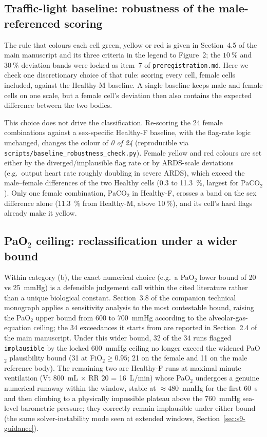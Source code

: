 \documentclass[pdflatex,sn-nature]{sn-jnl}%
\newcommand{\mainref}[2]{#2}
\begin{document}
\subsection{Traffic-light baseline: robustness of the male-referenced scoring}\label{sec:s3-traffic}

The rule that colours each cell green, yellow or red is given in Section~\mainref{sec:methods-traffic}{4.5} of the main manuscript and its three criteria in the legend to Figure~2; the $10~\%$ and $30~\%$ deviation bands were locked as item~7 of \texttt{preregistration.md}. Here we check one discretionary choice of that rule: scoring every cell, female cells included, against the Healthy-M baseline. A single baseline keeps male and female cells on one scale, but a female cell's deviation then also contains the expected difference between the two bodies.

This choice does not drive the classification. Re-scoring the 24 female combinations against a sex-specific Healthy-F baseline, with the flag-rate logic unchanged, changes the colour of \emph{0 of 24} (reproducible via \texttt{scripts/baseline\_robustness\_check.py}). Female yellow and red colours are set either by the diverged/implausible flag rate or by ARDS-scale deviations (e.g.\ output heart rate roughly doubling in severe ARDS), which exceed the male--female differences of the two Healthy cells (0.3 to 11.3~\%, largest for PaCO$_2$). Only one female combination, PaCO$_2$ in Healthy-F, crosses a band on the sex difference alone (11.3~\% from Healthy-M, above $10~\%$), and its cell's hard flags already make it yellow.

\subsection{PaO$_2$ ceiling: reclassification under a wider bound}\label{sec:s3-pao2-sensitivity}

Within category (b), the exact numerical choice (e.g.\ a PaO$_2$ lower bound of 20 vs 25~mmHg) is a defensible judgement call within the cited literature rather than a unique biological constant. Section~3.8 of the companion technical monograph applies a sensitivity analysis to the most contestable bound, raising the PaO$_2$ upper bound from 600 to 700~mmHg according to the alveolar-gas-equation ceiling; the 34 exceedances it starts from are reported in Section~\mainref{sec:results-hyperoxia}{2.4} of the main manuscript. Under this wider bound, 32 of the 34 runs flagged \texttt{implausible} by the locked 600~mmHg ceiling no longer exceed the widened PaO$_2$ plausibility bound (31 at FiO$_2 \geq 0.95$; 21 on the female and 11 on the male reference body). The remaining two are Healthy-F runs at maximal minute ventilation (Vt 800~mL $\times$ RR 20 = 16~L/min) whose PaO$_2$ undergoes a genuine numerical runaway within the window, stable at $\approx$480~mmHg for the first 60~s and then climbing to a physically impossible plateau above the 760~mmHg sea-level barometric pressure; they correctly remain implausible under either bound (the same solver-instability mode seen at extended windows, Section~\ref{sec:s9-guidance}).
\end{document}
